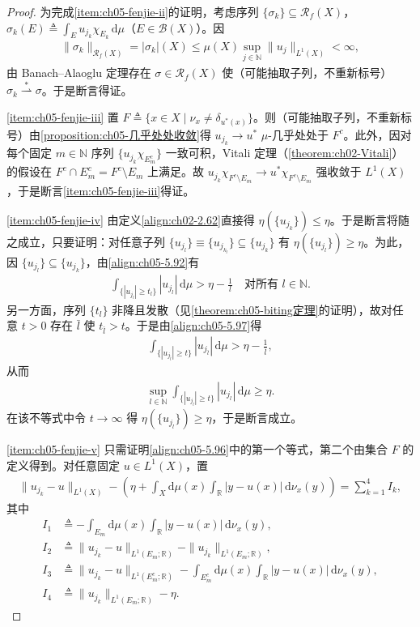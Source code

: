 \documentclass[../../main.tex]{subfiles}
\begin{document}
\begin{proof}
为完成\cref{item:ch05-fenjie-ii}的证明，考虑序列 $\{\sigma_k\}\subseteq\mathscr{R}_f(X)$，$\sigma_k(E)\triangleq\int_Eu_{j_k}\chi_{E_k}\,\mathrm{d}\mu$（$E\in\mathscr{B}(X)$）。因
\begin{align*}
\|\sigma_k\|_{\mathscr{R}_f(X)}=|\sigma_k|(X)\leqslant\mu(X)\sup_{j\in\mathbb{N}}\|u_j\|_{L^1(X)}<\infty,
\end{align*}
由 Banach--Alaoglu 定理存在 $\sigma\in\mathscr{R}_f(X)$ 使（可能抽取子列，不重新标号）$\sigma_k\stackrel{*}{\rightharpoonup}\sigma$。于是断言得证。

\cref{item:ch05-fenjie-iii} 置 $F\triangleq\{x\in X\mid\nu_x\neq\delta_{u^*(x)}\}$。则（可能抽取子列，不重新标号）由\cref{proposition:ch05-几乎处处收敛}得 $u_{j_k}\to u^*$ $\mu$-几乎处处于 $F^c$。此外，因对每个固定 $m\in\mathbb{N}$ 序列 $\{u_{j_k}\chi_{E_m^c}\}$ 一致可积，Vitali 定理（\cref{theorem:ch02-Vitali}）的假设在 $F^c\cap E_m^c=F^c\setminus E_m$ 上满足。故 $u_{j_k}\chi_{F^c\setminus E_m}\to u^*\chi_{F^c\setminus E_m}$ 强收敛于 $L^1(X)$，于是断言\cref{item:ch05-fenjie-iii}得证。

\cref{item:ch05-fenjie-iv} 由定义\eqref{align:ch02-2.62}直接得 $\eta(\{u_{j_k}\})\leqslant\eta$。于是断言将随之成立，只要证明：对任意子列 $\{u_{j_l}\}\equiv\{u_{j_{k_l}}\}\subseteq\{u_{j_k}\}$ 有 $\eta(\{u_{j_l}\})\geqslant\eta$。为此，因 $\{u_{j_l}\}\subseteq\{u_{j_k}\}$，由\eqref{align:ch05-5.92}有
\begin{align}
\int_{\{|u_{j_l}|\geqslant t_l\}}|u_{j_l}|\,\mathrm{d}\mu>\eta-\frac1l
\quad\text{对所有 }l\in\mathbb{N}.\label{align:ch05-5.97}
\end{align}
另一方面，序列 $\{t_l\}$ 非降且发散（见\cref{theorem:ch05-biting定理}的证明），故对任意 $t>0$ 存在 $\bar l$ 使 $t_{\bar l}>t$。于是由\eqref{align:ch05-5.97}得
\begin{align*}
\int_{\{|u_{j_{\bar l}}|\geqslant t\}}|u_{j_{\bar l}}|\,\mathrm{d}\mu>\eta-\frac1{\bar l},
\end{align*}
从而
\begin{align*}
\sup_{l\in\mathbb{N}}\int_{\{|u_{j_l}|\geqslant t\}}|u_{j_l}|\,\mathrm{d}\mu\geqslant\eta.
\end{align*}
在该不等式中令 $t\to\infty$ 得 $\eta(\{u_{j_l}\})\geqslant\eta$，于是断言成立。

\cref{item:ch05-fenjie-v} 只需证明\eqref{align:ch05-5.96}中的第一个等式，第二个由集合 $F$ 的定义得到。对任意固定 $u\in L^1(X)$，置
\begin{align*}
\|u_{j_k}-u\|_{L^1(X)}-\left(\eta+\int_X\mathrm{d}\mu(x)\int_{\mathbb{R}}|y-u(x)|\,\mathrm{d}\nu_x(y)\right)=\sum_{k=1}^4I_k,
\end{align*}
其中
\begin{align*}
I_1&\triangleq-\int_{E_m}\mathrm{d}\mu(x)\int_{\mathbb{R}}|y-u(x)|\,\mathrm{d}\nu_x(y),\\
I_2&\triangleq\|u_{j_k}-u\|_{L^1(E_m;\mathbb{R})}-\|u_{j_k}\|_{L^1(E_m;\mathbb{R})},\\
I_3&\triangleq\|u_{j_k}-u\|_{L^1(E_m^c;\mathbb{R})}-\int_{E_m^c}\mathrm{d}\mu(x)\int_{\mathbb{R}}|y-u(x)|\,\mathrm{d}\nu_x(y),\\
I_4&\triangleq\|u_{j_k}\|_{L^1(E_m;\mathbb{R})}-\eta.
\end{align*}


\end{proof}
\end{document}
